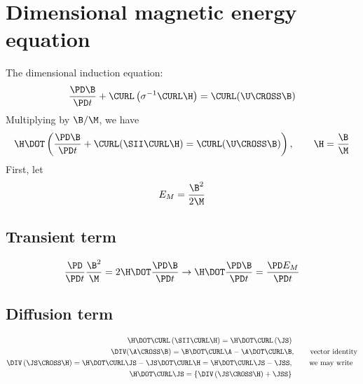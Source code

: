 \documentclass[11pt]{article}
\begin{document}
\doublespacing
\MOONSTITLE
\maketitle

\section{Dimensional magnetic energy equation}
The dimensional induction equation:
\begin{equation}
	\frac{\PD \B}{\PD t} + \CURL \left( \sigma^{-1}\CURL \H \right)
	= \CURL (\U \CROSS \B)
\end{equation}
Multiplying by $\B / \M$, we have
\begin{equation}
	\H \DOT
	\left(
	\frac{\PD \B}{\PD t} +
	\CURL (\SII \CURL \H) =
	\CURL (\U \CROSS \B)
	\right), \qquad \H = \frac{\B}{\M}
\end{equation}
First, let
\begin{equation}
	E_M = \frac{\B^2}{2\M}
\end{equation}

\subsection{Transient term}
\begin{equation}
	\frac{\PD}{\PD t} \frac{\B^2}{\M} = 2 \H \DOT \frac{\PD \B}{\PD t}
	\rightarrow
	\H \DOT \frac{\PD \B}{\PD t} =
	\frac{\PD E_M}{\PD t}
\end{equation}
\subsection{Diffusion term}
\begin{equation}\begin{aligned}
	\H \DOT \CURL \left( \SII \CURL \H \right) = \H \DOT \CURL \left( \JS \right) & \\
	\DIV (\A \CROSS \B) = \B \DOT \CURL \A - \A \DOT \CURL \B &, \qquad \text{vector identity} \\
	\DIV \left(\JS \CROSS \H \right) =
	\H \DOT \CURL \JS - \JS \DOT \CURL \H =
	\H \DOT \CURL \JS - \JSS, & \qquad \text{ we may write} \\
	\H \DOT \CURL \JS =
	\left\{ \DIV \left(\JS \CROSS \H \right) + \JSS \right\}
\end{aligned}\end{equation}
\end{document}
